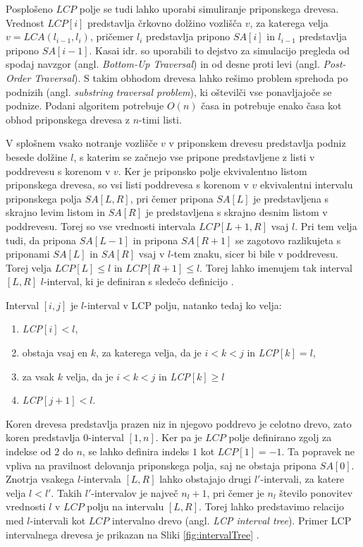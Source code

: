 Posplošeno $LCP$ polje se tudi lahko uporabi simuliranje priponskega drevesa. Vrednost $LCP[i]$ predstavlja črkovno dolžino vozlišča $v$, za katerega velja $v=LCA(l_{i-1},l_i)$, pričemer $l_i$ predstavlja pripono $SA[i]$ in $l_{i-1}$ predstavlja pripono $SA[i-1]$. Kasai idr. \cite{Kasai2001} so uporabili to dejstvo za simulacijo pregleda od spodaj navzgor (angl. \textit{Bottom-Up Traversal}) in od desne proti levi (angl. \textit{Post-Order Traversal}). S takim obhodom drevesa lahko rešimo problem sprehoda po podnizih (angl. \textit{substring traversal problem}), ki oštevilči vse ponavljajoče se podnize. Podani algoritem potrebuje $O(n)$ časa in potrebuje enako časa kot obhod priponskega drevesa z $n$-timi listi.

V splošnem vsako notranje vozlišče $v$ v priponskem drevesu predstavlja podniz besede dolžine $l$, s katerim se začnejo vse pripone predstavljene z listi v poddrevesu s korenom v $v$. Ker je priponsko polje ekvivalentno listom priponskega drevesa, so vsi listi poddrevesa s korenom v $v$ ekvivalentni intervalu priponskega polja $SA[L,R]$, pri čemer pripona $SA[L]$ je predstavljena s skrajno levim listom in $SA[R]$ je predstavljena s skrajno desnim listom v poddrevesu. Torej so vse vrednosti intervala $LCP[L+1,R]$ vsaj $l$. Pri tem velja tudi, da pripona $SA[L-1]$ in pripona $SA[R+1]$ se zagotovo razlikujeta s priponami $SA[L]$ in $SA[R]$ vsaj v $l$-tem znaku, sicer bi bile v poddrevesu. Torej velja $LCP[L]\le l$ in $LCP[R+1]\le l$. Torej lahko imenujem tak interval $[L,R]$ $l$-interval, ki je definiran s sledečo definicijo \cite{Abouelhoda2004}.
\begin{defi}
    Interval $[i,j]$ je $l$-interval v LCP polju, natanko tedaj ko velja:
    \begin{enumerate}
        \item \textit{LCP}$[i]<l$,
        \item obstaja vsaj en $k$, za katerega velja, da je $i< k< j$ in \textit{LCP}$[k]=l$,
        \item za vsak $k$ velja, da je $i< k< j$ in \textit{LCP}$[k]\ge l$
        \item \textit{LCP}$[j+1]<l$.      
    \end{enumerate}
\end{defi}

Koren drevesa predstavlja prazen niz in njegovo poddrevo je celotno drevo, zato koren predstavlja $0$-interval $[1,n]$. Ker pa je $LCP$ polje definirano zgolj za indekse od $2$ do $n$, se lahko definira indeks $1$ kot $LCP[1]=-1$. Ta popravek ne vpliva na pravilnost delovanja priponskega polja, saj ne obstaja pripona $SA[0]$. Znotrja vsakega $l$-intervala $[L,R]$ lahko obstajajo drugi $l'$-intervali, za katere velja $l<l'$. Takih $l'$-intervalov je največ $n_l+1$, pri čemer je $n_l$ število ponovitev vrednosti $l$ v $LCP$ polju na intervalu $[L,R]$. Torej lahko predstavimo relacijo med $l$-intervali kot $LCP$ intervalno drevo (angl. \textit{LCP interval tree}). Primer LCP intervalnega drevesa je prikazan na Sliki \ref{fig:intervalTree} \cite{Abouelhoda2004}.

